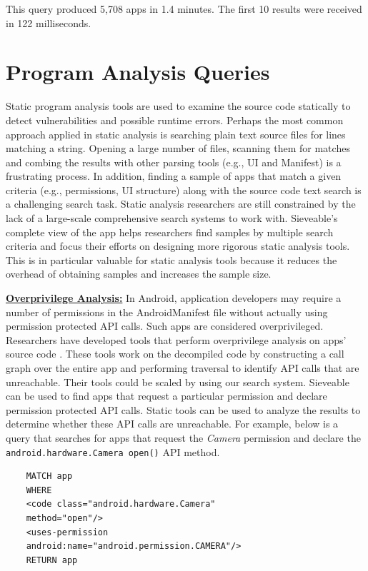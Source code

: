 This query produced 5,708 apps in 1.4 minutes. The first 10 results were received in 122 milliseconds.
\section{Program Analysis Queries}
Static program analysis tools are used to examine the source code statically to detect vulnerabilities and possible runtime errors.
Perhaps the most common approach applied in static analysis is searching plain text source files for lines matching a string.
Opening a large number of files, scanning them for matches and combing the results with other parsing tools (e.g., UI and Manifest) is a frustrating process. 
In addition, finding a sample of apps that match a given criteria (e.g., permissions, UI structure) along with the source code text search is a challenging search task.
Static analysis researchers are still constrained by the lack of a large-scale comprehensive search systems to work with.
Sieveable's complete view of the app helps researchers find samples by multiple search criteria and focus their efforts on designing more rigorous static analysis tools.
This is in particular valuable for static analysis tools because it reduces the overhead of obtaining samples and increases the sample size.

\underline{\textbf{Overprivilege Analysis:}}
In Android, application developers may require a number of permissions in the AndroidManifest file without actually using permission protected API calls. Such apps are considered overprivileged. 
Researchers have developed tools that perform overprivilege analysis on apps' source code \cite{felt2011android,au2012pscout}.
These tools work on the decompiled code by constructing a call graph over the entire app and performing traversal to identify API calls that are unreachable.
Their tools could be scaled by using our search system. 
Sieveable can be used to find apps that request a particular permission and declare permission protected API calls.
Static tools can be used to analyze the results to determine whether these API calls are unreachable.
For example, below is a query that searches for apps that request the \textit{Camera} permission and declare the \texttt{android.hardware.Camera open()} API method.

\begin{verbatim}
	MATCH app
	WHERE
	<code class="android.hardware.Camera"
	method="open"/>
	<uses-permission 
	android:name="android.permission.CAMERA"/>
	RETURN app
\end{verbatim}

